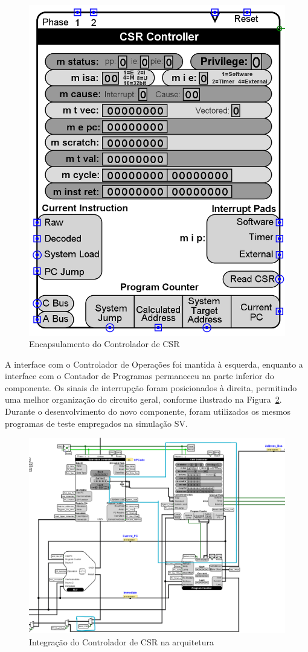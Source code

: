 \documentclass[
	12pt,				%
	openright,			%
	oneside,			%
	a4paper,			%
	english,			%
	french,				%
	spanish,			%
	brazil,				%
	]{abntex2}
\begin{document}
\begin{figure}[h]
    \centering
    \includegraphics[width=0.5\linewidth]{ProcessoDesenvolvimento/Arquitetura/CSR_Controler_Component.png}
    \caption{Encapsulamento do Controlador de CSR}
    \label{fig:CSR_Controller_Visual}
\end{figure}

A interface com o Controlador de Operações foi mantida à esquerda, enquanto a interface com o Contador de Programas permaneceu na parte inferior do componente. Os sinais de interrupção foram posicionados à direita, permitindo uma melhor organização do circuito geral, conforme ilustrado na Figura~\ref{fig:CSR_Integrated}. Durante o desenvolvimento do novo componente, foram utilizados os mesmos programas de teste empregados na simulação SV.

\begin{figure}[h]
    \centering
    \includegraphics[width=0.75\linewidth]{ProcessoDesenvolvimento/Arquitetura/IntegraçãoControladorCSR.png}
    \caption{Integração do Controlador de CSR na arquitetura}
    \label{fig:CSR_Integrated}
\end{figure}
\end{document}
